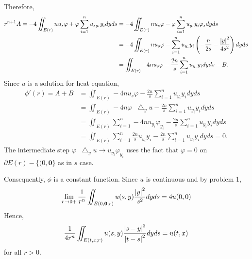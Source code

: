 \documentclass{article}
\newcommand*\Laplace{\mathop{}\!\mathbin\bigtriangleup}
\begin{document}
Therefore,
\begin{equation*}
\begin{split}
r^{n+1}A=-4\iint_{E(r)} nu_s\varphi + \varphi\sum\limits_{i=1}^n u_{sy_i} y_i  dyds &= -4\iint_{E(r)} nu_s\varphi - \varphi\sum\limits_{i=1}^n u_{y_i} y_i \varphi_s dyds \\
&=-4\iint_{E(r)} nu_s\varphi - \sum\limits_{i=1}^n u_{y_i} y_i \left(-\frac{n}{2s}-\frac{\abs{y}^2}{4s^2}\right) dyds \\
&=\iint_{E(r)} -4nu_s\varphi - \frac{2n}{s}\sum\limits_{i=1}^n u_{y_i} y_i dyds - B.
\end{split}
\end{equation*}
Since $u$ is a solution for heat equation,
\begin{equation*}
\begin{split}
\phi'(r)=A+B&=\iint_{E(r)} -4nu_s\varphi - \frac{2n}{s}\sum\limits_{i=1}^n u_{y_i} y_i dyds \\
&=\iint_{E(r)} -4n\varphi\Laplace_y u - \frac{2n}{s}\sum\limits_{i=1}^n u_{y_i} y_i dyds \\
&=\iint_{E(r)} \sum\limits_{i=1}^n-4n u_{y_i}\varphi_{y_i} - \frac{2n}{s}\sum\limits_{i=1}^n u_{y_i} y_i dyds \\
&=\iint_{E(r)} \sum\limits_{i=1}^n\frac{2n}{s} u_{y_i}y_i - \frac{2n}{s}\sum\limits_{i=1}^n u_{y_i} y_i dyds = 0.
\end{split}
\end{equation*}
The intermediate step $\varphi\Laplace_y u \rightarrow u_{y_i}\varphi_{y_i}$ uses the fact that $\varphi=0$ on $\partial E(r)-\{(0, \bm{0}\}$ as in $s$ case.

Consequently, $\phi$ is a constant function. Since $u$ is continuous and by problem 1,
\begin{equation*}
\lim\limits_{r\rightarrow 0+}\frac{1}{r^n}\iint_{E(0,\bm{0};r)}u(s,y)\frac{\abs{y}^2}{s^2}dyds =4u(0,0) 
\end{equation*}
Hence, 
\begin{equation*}
\frac{1}{4r^n}\iint_{E(t,x;r)}u(s,y)\frac{\abs{s-y}^2}{\abs{t-s}^2}dyds = u(t,x)
\end{equation*}
for all $r>0$.
\end{document}
